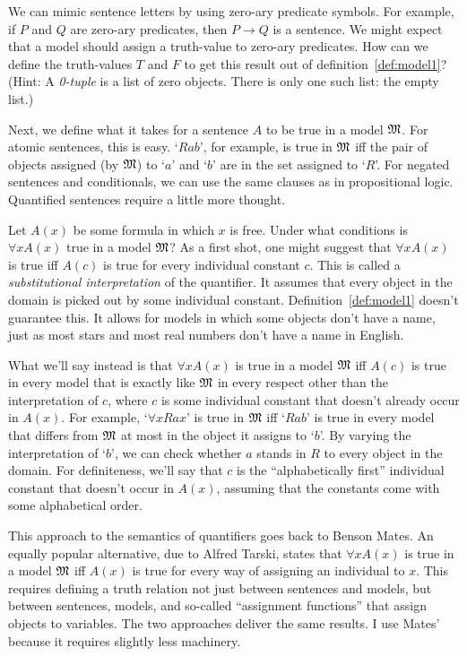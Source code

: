 \begin{exercise}
  We can mimic sentence letters
  by using zero-ary predicate symbols.
  For example,
  if $P$ and $Q$ are zero-ary predicates,
  then $P \to Q$ is a sentence.
  We might expect that a model should assign a truth-value to zero-ary predicates.
  How can we define the truth-values $T$ and $F$ to get this result
  out of definition~\ref{def:model1}?
  (Hint:
  A \emph{0-tuple} is a list of zero objects.
  There is only one such list: the empty list.)
\end{exercise}

Next,
we define what
it takes for a sentence $A$ to be true in a model $\mathfrak{M}$.
For atomic sentences,
this is easy.
`$Rab$', for example, is true in $\mathfrak{M}$ iff
the pair of objects assigned (by $\mathfrak{M}$) to `$a$' and `$b$'
are in the set assigned to `$R$'.
For negated sentences and conditionals,
we can use the same clauses as in propositional logic.
Quantified sentences require a little more thought.

Let $A(x)$ be some formula in which $x$ is free.
Under what conditions is $\forall x A(x)$ true in a model $\mathfrak{M}$?
As a first shot,
one might suggest that
$\forall x A(x)$ is true iff $A(c)$ is true for every individual constant $c$.
This is called a \textit{substitutional interpretation} of the quantifier.
It assumes that
every object in the domain is picked out by some individual constant.
Definition~\ref{def:model1} doesn't guarantee this.
It allows for models in which
some objects don't have a name,
just as most stars and most real numbers don't have a name in English.

What we'll say instead is that
$\forall x A(x)$ is true in a model $\mathfrak{M}$ iff
$A(c)$ is true in every model
that is exactly like $\mathfrak{M}$ in every respect other than the interpretation of $c$,
where $c$ is some individual constant that doesn't already occur in $A(x)$.
For example,
`$\forall x Rax$' is true in $\mathfrak{M}$
iff `$Rab$' is true in every model that differs from $\mathfrak{M}$ at most in the object it assigns to `$b$'.
By varying the interpretation of `$b$',
we can check whether $a$ stands in $R$ to every object in the domain.
For definiteness,
we'll say that $c$ is the ``alphabetically first'' individual constant
that doesn't occur in $A(x)$,
assuming that the constants come with some alphabetical order.

This approach to the semantics of quantifiers goes back to Benson Mates.
An equally popular alternative,
due to Alfred Tarski,
states that
$\forall x A(x)$ is true in a model $\mathfrak{M}$ iff
$A(x)$ is true for every way of assigning an individual to $x$.
This requires defining a truth relation
not just between sentences and models,
but between sentences, models, and so-called ``assignment functions''
that assign objects to variables.
The two approaches deliver the same results.
I use Mates' because it requires slightly less machinery.

